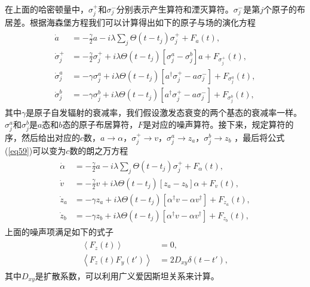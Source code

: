 在上面的哈密顿量中，$\sigma_j^+$和$\sigma_j^-$分别表示产生算符和湮灭算符。$\sigma_j^-$是第$j$个原子的布居差。根据海森堡方程我们可以计算得出如下的原子与场的演化方程
\begin{align}\label{eq59}
\begin{split}
\dot a &=  - \frac{\gamma }{2}a - i\lambda \sum\nolimits_j {\Theta \left( {t - {t_j}} \right)} \sigma _j^ +  + {F_a}\left( t \right),\\
\dot \sigma _j^ + & =  - \frac{\gamma }{2}\sigma _j^ +  + i\lambda \Theta \left( {t - {t_j}} \right)\left[ {\sigma _j^a - \sigma _j^b} \right]a + {F_{\sigma _j^ + }}\left( t \right),\\
\dot \sigma _j^a &=  - \gamma \sigma _j^a + i\lambda \Theta \left( {t - {t_j}} \right)\left[ {{a^\dag }\sigma _j^ +  - a\sigma _j^ - } \right] + {F_{\sigma _j^a}}\left( t \right),\\
\dot \sigma _j^b &=  - \gamma \sigma _j^b + i\lambda \Theta \left( {t - {t_j}} \right)\left[ {{a^\dag }\sigma _j^ +  - a\sigma _j^ - } \right] + {F_{\sigma _j^b}}\left( t \right),
\end{split}
\end{align}
其中$\gamma$是原子自发辐射的衰减率，我们假设激发态衰变的两个基态的衰减率一样。$\sigma _j^a$和$\sigma _j^b$是$a$态和$b$态的原子布居算符，$F$是对应的噪声算符。接下来，规定算符的序，然后给出对应的$c$数，$a \to \alpha $，$\sigma _j^ +  \to v$，$\sigma _j^a \to {z_a}$，$\sigma _j^b \to {z_b}$ ，最后将公式(\ref{eq59})可以变为$c$数的朗之万方程
\begin{align}\label{eq60}
\begin{split}
\dot \alpha  &=  - \frac{\gamma }{2}a - i\lambda \sum\nolimits_j {\Theta \left( {t - {t_j}} \right)} \sigma _j^ +  + {F_\alpha }\left( t \right),\\
\dot v &=  - \frac{\gamma }{2}v + i\lambda \Theta \left( {t - {t_j}} \right)\left[ {{z_a} - {z_b}} \right]\alpha  + {F_v}\left( t \right),\\
{{\dot z}_a} &=  - \gamma {z_a} + i\lambda \Theta \left( {t - {t_j}} \right)\left[ {{\alpha ^\dag }v - \alpha {v^\dag }} \right] + {F_{{z_a}}}\left( t \right),\\
{{\dot z}_b} &=  - \gamma {z_b} + i\lambda \Theta \left( {t - {t_j}} \right)\left[ {{\alpha ^\dag }v - \alpha {v^\dag }} \right] + {F_{{z_b}}}\left( t \right),
\end{split}
\end{align}
上面的噪声项满足如下的式子
\begin{align}\label{eq61}
\begin{split}
\left\langle {{F_z}\left( t \right)} \right\rangle  &= 0,\\
\left\langle {{F_z}\left( t \right){F_y}\left( {t'} \right)} \right\rangle  &= 2{D_{xy}}\delta \left( {t - t'} \right),
\end{split}
\end{align}
其中$D_{xy}$是扩散系数，可以利用广义爱因斯坦关系\cite{PhysRevA.76.033804,JOB}来计算。

